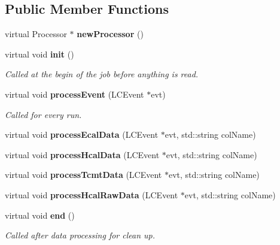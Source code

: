 \subsection*{Public Member Functions}
\begin{DoxyCompactItemize}
\item 
virtual Processor $\ast$ {\bfseries new\-Processor} ()\label{classdigisim_1_1Analysis_a7833aa1aec8aba2ff528f318c9f7a21f}

\item 
virtual void {\bf init} ()
\begin{DoxyCompactList}\small\item\em Called at the begin of the job before anything is read. \end{DoxyCompactList}\item 
virtual void {\bf process\-Event} (L\-C\-Event $\ast$evt)
\begin{DoxyCompactList}\small\item\em Called for every run. \end{DoxyCompactList}\item 
virtual void {\bfseries process\-Ecal\-Data} (L\-C\-Event $\ast$evt, std\-::string col\-Name)\label{classdigisim_1_1Analysis_a8d1bb0673ddeb75a6e75f79bbd34bf08}

\item 
virtual void {\bfseries process\-Hcal\-Data} (L\-C\-Event $\ast$evt, std\-::string col\-Name)\label{classdigisim_1_1Analysis_a926b71c47a87e0dab62fba442bc8f470}

\item 
virtual void {\bfseries process\-Tcmt\-Data} (L\-C\-Event $\ast$evt, std\-::string col\-Name)\label{classdigisim_1_1Analysis_ac67d2029aaafe07d629e3544ae87cd77}

\item 
virtual void {\bfseries process\-Hcal\-Raw\-Data} (L\-C\-Event $\ast$evt, std\-::string col\-Name)\label{classdigisim_1_1Analysis_abc397c722130e36df08c04038798024b}

\item 
virtual void {\bf end} ()\label{classdigisim_1_1Analysis_a50de7a9a3fd99be0766ce248fc337d9e}

\begin{DoxyCompactList}\small\item\em Called after data processing for clean up. \end{DoxyCompactList}\end{DoxyCompactItemize}
